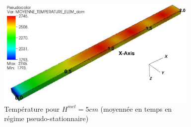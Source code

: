 \begin{frame}[fragile]
\begin{itemize}
\begin{columns}[T]
\begin{column}{0.7\textwidth}
\begin{figure}[H]
	\end{figure}
		\end{column}
		\begin{column}{0.3\textwidth}
	\begin{figure}[H]
	\centering \includegraphics[width=\textwidth]{Figures/Fig5_Peybernes2020.png} \\
	{\tiny Température pour $H^{met}=5cm$ (moyennée en temps en régime pseudo-stationnaire)}
	\end{figure}
		\end{column}
		\end{columns}
	\end{itemize}
\end{frame}
